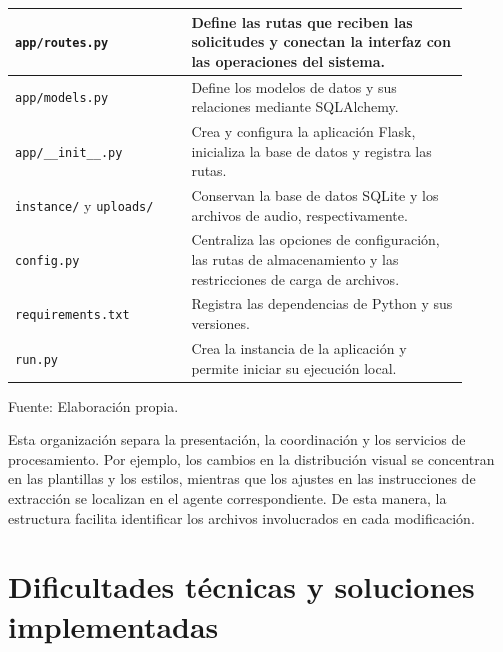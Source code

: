 \begin{table}[H]
\begin{tabular}{
        |>{\raggedright\arraybackslash}p{0.35\linewidth}
        |>{\raggedright\arraybackslash}p{0.55\linewidth}|
    }
        \texttt{app/routes.py} &
        Define las rutas que reciben las solicitudes
        y conectan la interfaz con las operaciones
        del sistema. \\
        \hline

        \texttt{app/models.py} &
        Define los modelos de datos y sus relaciones
        mediante SQLAlchemy. \\
        \hline

        \texttt{app/\_\_init\_\_.py} &
        Crea y configura la aplicación Flask,
        inicializa la base de datos y registra
        las rutas. \\
        \hline

        \texttt{instance/} y \texttt{uploads/} &
        Conservan la base de datos SQLite
        y los archivos de audio, respectivamente. \\
        \hline

        \texttt{config.py} &
        Centraliza las opciones de configuración,
        las rutas de almacenamiento y las
        restricciones de carga de archivos. \\
        \hline

        \texttt{requirements.txt} &
        Registra las dependencias de Python
        y sus versiones. \\
        \hline

        \texttt{run.py} &
        Crea la instancia de la aplicación
        y permite iniciar su ejecución local. \\
        \hline
    \end{tabular}

    \par\smallskip
    \begin{minipage}{0.95\linewidth}
        \footnotesize Fuente: Elaboración propia.
    \end{minipage}
    \endgroup
\end{table}

Esta organización separa la presentación, la coordinación
y los servicios de procesamiento. Por ejemplo, los cambios
en la distribución visual se concentran en las plantillas
y los estilos, mientras que los ajustes en las instrucciones
de extracción se localizan en el agente correspondiente.
De esta manera, la estructura facilita identificar
los archivos involucrados en cada modificación.



\section{Dificultades técnicas y soluciones implementadas}


